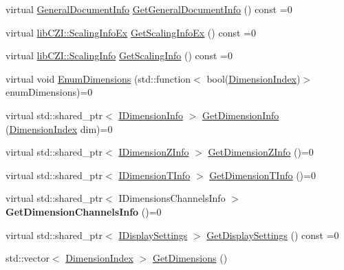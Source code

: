 \begin{DoxyCompactItemize}
\item 
virtual \hyperlink{structlib_c_z_i_1_1_general_document_info}{General\+Document\+Info} \hyperlink{classlib_c_z_i_1_1_i_czi_multi_dimension_document_info_aefea877fc65e9510d9a3127e366cb85c}{Get\+General\+Document\+Info} () const =0
\item 
virtual \hyperlink{structlib_c_z_i_1_1_scaling_info_ex}{lib\+C\+Z\+I\+::\+Scaling\+Info\+Ex} \hyperlink{classlib_c_z_i_1_1_i_czi_multi_dimension_document_info_a78275ba9453cb6a75081079d0a5bac1c}{Get\+Scaling\+Info\+Ex} () const =0
\item 
virtual \hyperlink{structlib_c_z_i_1_1_scaling_info}{lib\+C\+Z\+I\+::\+Scaling\+Info} \hyperlink{classlib_c_z_i_1_1_i_czi_multi_dimension_document_info_ae94341e3e5824b8c1d5c84928ced2e6c}{Get\+Scaling\+Info} () const =0
\item 
virtual void \hyperlink{classlib_c_z_i_1_1_i_czi_multi_dimension_document_info_a23f7b26bd323732fac0d190e9b38b6e3}{Enum\+Dimensions} (std\+::function$<$ bool(\hyperlink{namespacelib_c_z_i_a55049658acf59d0eddfaebcad16df424}{Dimension\+Index})$>$ enum\+Dimensions)=0
\item 
virtual std\+::shared\+\_\+ptr$<$ \hyperlink{classlib_c_z_i_1_1_i_dimension_info}{I\+Dimension\+Info} $>$ \hyperlink{classlib_c_z_i_1_1_i_czi_multi_dimension_document_info_a1e5d72c39dc22f99e1ee27b21055d3ea}{Get\+Dimension\+Info} (\hyperlink{namespacelib_c_z_i_a55049658acf59d0eddfaebcad16df424}{Dimension\+Index} dim)=0
\item 
virtual std\+::shared\+\_\+ptr$<$ \hyperlink{classlib_c_z_i_1_1_i_dimension_z_info}{I\+Dimension\+Z\+Info} $>$ \hyperlink{classlib_c_z_i_1_1_i_czi_multi_dimension_document_info_a58fbba886729ac71ae4be8a75a6e96f5}{Get\+Dimension\+Z\+Info} ()=0
\item 
virtual std\+::shared\+\_\+ptr$<$ \hyperlink{classlib_c_z_i_1_1_i_dimension_t_info}{I\+Dimension\+T\+Info} $>$ \hyperlink{classlib_c_z_i_1_1_i_czi_multi_dimension_document_info_a5b052b9eaa3b4e2dadb7ffe6e222006c}{Get\+Dimension\+T\+Info} ()=0
\item 
\mbox{\label{classlib_c_z_i_1_1_i_czi_multi_dimension_document_info_a8ae66d4d866ddd93efd19b1cb0d54b0e}} 
virtual std\+::shared\+\_\+ptr$<$ I\+Dimensions\+Channels\+Info $>$ {\bfseries Get\+Dimension\+Channels\+Info} ()=0
\item 
virtual std\+::shared\+\_\+ptr$<$ \hyperlink{classlib_c_z_i_1_1_i_display_settings}{I\+Display\+Settings} $>$ \hyperlink{classlib_c_z_i_1_1_i_czi_multi_dimension_document_info_a8aff8239a31b047b737f80be0b2c9bda}{Get\+Display\+Settings} () const =0
\item 
std\+::vector$<$ \hyperlink{namespacelib_c_z_i_a55049658acf59d0eddfaebcad16df424}{Dimension\+Index} $>$ \hyperlink{classlib_c_z_i_1_1_i_czi_multi_dimension_document_info_aede2d6dd6e991151afff77b0cb96834a}{Get\+Dimensions} ()
\end{DoxyCompactItemize}


